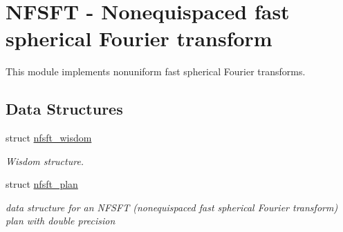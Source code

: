 \hypertarget{group__nfsft}{\section{N\-F\-S\-F\-T -\/ Nonequispaced fast spherical Fourier transform}
\label{group__nfsft}
}


This module implements nonuniform fast spherical Fourier transforms.  


\subsection*{Data Structures}
\begin{DoxyCompactItemize}
\item 
struct \hyperlink{structnfsft__wisdom}{nfsft\-\_\-wisdom}
\begin{DoxyCompactList}\small\item\em Wisdom structure. \end{DoxyCompactList}\item 
struct \hyperlink{structnfsft__plan}{nfsft\-\_\-plan}
\begin{DoxyCompactList}\small\item\em data structure for an N\-F\-S\-F\-T (nonequispaced fast spherical Fourier transform) plan with double precision \end{DoxyCompactList}\end{DoxyCompactItemize}
